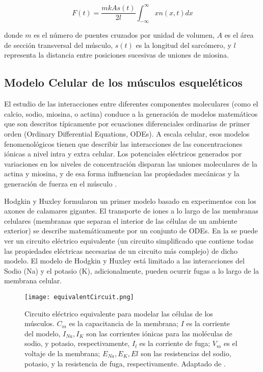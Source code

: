 \begin{equation}
	F(t) = \frac{m k As(t)}{2l} \int_{-\infty}^\infty x n(x,t) dx
\end{equation}

donde $m$ es el número de puentes cruzados por unidad de volumen, $A$ es el área de sección transversal del músculo, $s(t)$ es la longitud del sarcómero, y $l$ representa la distancia entre posiciones sucesivas de uniones de miosina.

\subsection{Modelo Celular de los músculos esqueléticos}

El estudio de las interacciones entre diferentes componentes moleculares (como el calcio, sodio, miosina, o actina) conduce a la generación de modelos matemáticos que son descritos típicamente por ecuaciones diferenciales ordinarias de primer orden (Ordinary Differential Equations, ODEs). A escala celular, esos modelos fenomenológicos tienen que describir las interacciones de las concentraciones iónicas a nivel intra y extra celular. Los potenciales eléctricos generados por variaciones en los niveles de concentración disparan las uniones moleculares de la actina y miosina, y de esa forma influencian las propiedades mecánicas y la generación de fuerza en el músculo \citep{rohrle2010simulating, matthias20113d}.

Hodgkin y Huxley \citep{hodgkin1952quantitative} formularon un primer modelo basado en experimentos con los axones de calamares gigantes. El transporte de iones a lo largo de las membranas celulares (membranas que separan el interior de las células de un ambiente exterior) se describe matemáticamente por un conjunto de ODEs. En la  se puede ver un circuito eléctrico equivalente (un circuito simplificado que contiene todas las propiedades eléctricas necesarias de un circuito más complejo) de dicho modelo. El modelo de Hodgkin y Huxley está limitado a las interacciones del Sodio (Na) y el potasio (K), adicionalmente, pueden ocurrir fugas a lo largo de la membrana celular.

\begin{figure}[!ht]
	\centering
		\texttt{[image: equivalentCircuit.png]}
	\caption[Circuito eléctrico equivalente para modelar las células de los músculos.]{Circuito eléctrico equivalente para modelar las células de los músculos. $C_m$ es la capacitancia de la membrana; $I$ es la corriente del modelo, $I_{Na}, I_K$ son las corrientes iónicas para las moléculas de sodio, y potasio, respectivamente, $I_l$ es la corriente de fuga; $V_m$ es el voltaje de la membrana; $E_{Na}, E_K, El$ son las resistencias del sodio, potasio, y la resistencia de fuga, respectivamente. Adaptado de \citep{matthias20113d}.}
	\label{fig:equivalentCircuit}
\end{figure}

